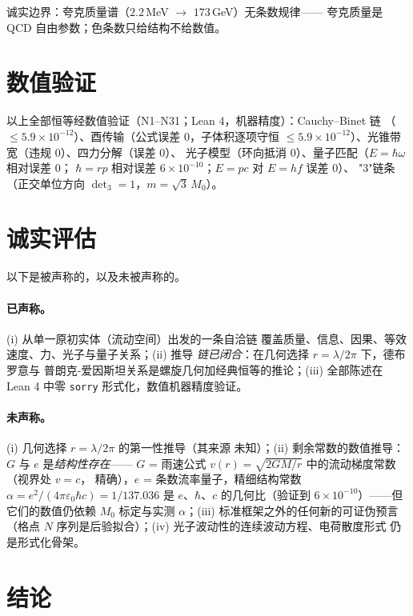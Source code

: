 \documentclass[aps,prd,preprint,superscriptaddress,amsmath,amssymb]{revtex4-2}
\begin{document}
诚实边界：夸克质量谱（$2.2$\,MeV $\to$ $173$\,GeV）无条数规律——
夸克质量是 QCD 自由参数；色条数只给结构不给数值。

\section{数值验证}
\label{sec:validation}

以上全部恒等经数值验证（N1--N31；Lean 4\cite{de2015lean}，机器精度）：Cauchy--Binet 链
（$\le 5.9\times10^{-12}$）、酉传输（公式误差 $0$，子体积逐项守恒
$\le 5.9\times10^{-12}$）、光锥带宽（违规 $0$）、四力分解（误差 $0$）、
光子模型（环向抵消 $0$）、量子匹配（$E=\hbar\omega$ 相对误差 $0$；
$\hbar=rp$ 相对误差 $6\times10^{-10}$；$E=pc$ 对 $E=hf$ 误差 $0$）、
"3"链条（正交单位方向 $\det_3=1$，$m=\sqrt3\,M_0$）。

\section{诚实评估}
\label{sec:honest}

以下是被声称的，以及未被声称的。

\paragraph{已声称。} (i) 从单一原初实体（流动空间）出发的一条自洽链
覆盖质量、信息、因果、等效速度、力、光子与量子关系；(ii) 推导
\emph{链已闭合}：在几何选择 $r=\lambda/2\pi$ 下，德布罗意与
普朗克-爱因斯坦关系是螺旋几何加经典恒等的推论；(iii) 全部陈述在
Lean 4 中零 \texttt{sorry} 形式化，数值机器精度验证。

\paragraph{未声称。} (i) 几何选择 $r=\lambda/2\pi$ 的第一性推导（其来源
未知）；(ii) 剩余常数的数值推导：$G$ 与 $e$ 是\emph{结构性存在}——
$G$ = 雨速公式 $v(r)=\sqrt{2GM/r}$ 中的流动梯度常数（视界处 $v=c$，
精确），$e$ = 条数流率量子，精细结构常数
$\alpha=e^2/(4\pi\varepsilon_0\hbar c)=1/137.036$ 是 $e$、$\hbar$、$c$
的几何比（验证到 $6\times10^{-10}$）——但它们的数值仍依赖 $M_0$
标定与实测 $\alpha$；(iii) 标准框架之外的任何新的可证伪预言（格点
$N$ 序列是后验拟合）；(iv) 光子波动性的连续波动方程、电荷散度形式
仍是形式化骨架。

\section{结论}
\label{sec:conclusion}
\end{document}
